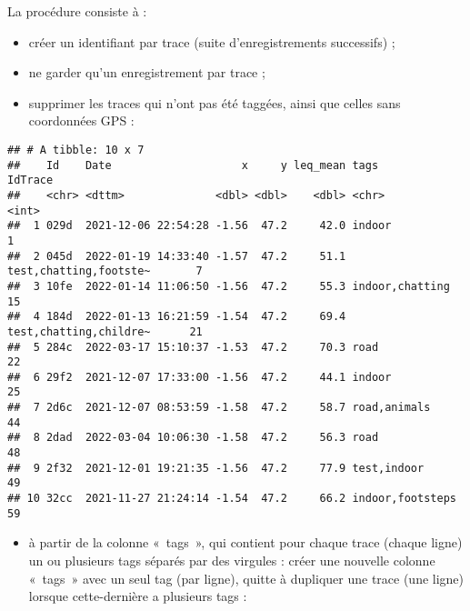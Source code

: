 \documentclass[
]{book}
\providecommand{\tightlist}{%
  \setlength{\itemsep}{0pt}\setlength{\parskip}{0pt}}
\begin{document}
La procédure consiste à :

\begin{itemize}
\tightlist
\item
  créer un identifiant par trace (suite d'enregistrements successifs) ;
\item
  ne garder qu'un enregistrement par trace ;
\item
  supprimer les traces qui n'ont pas été taggées, ainsi que celles sans coordonnées GPS :
\end{itemize}

\begin{verbatim}
## # A tibble: 10 x 7
##    Id    Date                    x     y leq_mean tags                   IdTrace
##    <chr> <dttm>              <dbl> <dbl>    <dbl> <chr>                    <int>
##  1 029d  2021-12-06 22:54:28 -1.56  47.2     42.0 indoor                       1
##  2 045d  2022-01-19 14:33:40 -1.57  47.2     51.1 test,chatting,footste~       7
##  3 10fe  2022-01-14 11:06:50 -1.56  47.2     55.3 indoor,chatting             15
##  4 184d  2022-01-13 16:21:59 -1.54  47.2     69.4 test,chatting,childre~      21
##  5 284c  2022-03-17 15:10:37 -1.53  47.2     70.3 road                        22
##  6 29f2  2021-12-07 17:33:00 -1.56  47.2     44.1 indoor                      25
##  7 2d6c  2021-12-07 08:53:59 -1.58  47.2     58.7 road,animals                44
##  8 2dad  2022-03-04 10:06:30 -1.58  47.2     56.3 road                        48
##  9 2f32  2021-12-01 19:21:35 -1.56  47.2     77.9 test,indoor                 49
## 10 32cc  2021-11-27 21:24:14 -1.54  47.2     66.2 indoor,footsteps            59
\end{verbatim}

\begin{itemize}
\tightlist
\item
  à partir de la colonne «~tags~», qui contient pour chaque trace (chaque ligne) un ou plusieurs tags séparés par des virgules : créer une nouvelle colonne «~tags~» avec un seul tag (par ligne), quitte à dupliquer une trace (une ligne) lorsque cette-dernière a plusieurs tags :
\end{itemize}
\end{document}
